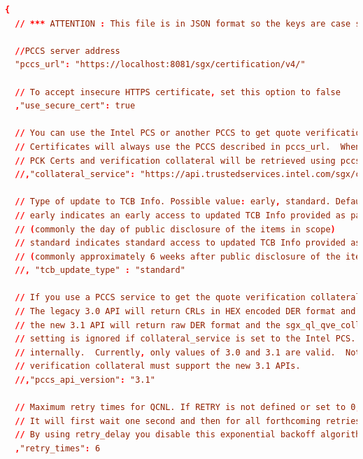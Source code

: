 \documentclass{article}
\begin{document}
\begin{lstlisting}[caption=Configurazione remote attestation per le Architectural Enclaves,label=default-qcnl.conf,language=toml]
{
  // *** ATTENTION : This file is in JSON format so the keys are case sensitive. Don't change them.

  //PCCS server address
  "pccs_url": "https://localhost:8081/sgx/certification/v4/"

  // To accept insecure HTTPS certificate, set this option to false
  ,"use_secure_cert": true

  // You can use the Intel PCS or another PCCS to get quote verification collateral.  Retrieval of PCK
  // Certificates will always use the PCCS described in pccs_url.  When collateral_service is not defined, both
  // PCK Certs and verification collateral will be retrieved using pccs_url
  //,"collateral_service": "https://api.trustedservices.intel.com/sgx/certification/v4/"

  // Type of update to TCB Info. Possible value: early, standard. Default is standard.
  // early indicates an early access to updated TCB Info provided as part of a TCB recovery event
  // (commonly the day of public disclosure of the items in scope)
  // standard indicates standard access to updated TCB Info provided as part of a TCB recovery event
  // (commonly approximately 6 weeks after public disclosure of the items in scope)
  //, "tcb_update_type" : "standard"

  // If you use a PCCS service to get the quote verification collateral, you can specify which PCCS API version is to be used.
  // The legacy 3.0 API will return CRLs in HEX encoded DER format and the sgx_ql_qve_collateral_t.version will be set to 3.0, while
  // the new 3.1 API will return raw DER format and the sgx_ql_qve_collateral_t.version will be set to 3.1. The pccs_api_version
  // setting is ignored if collateral_service is set to the Intel PCS. In this case, the pccs_api_version is forced to be 3.1
  // internally.  Currently, only values of 3.0 and 3.1 are valid.  Note, if you set this to 3.1, the PCCS use to retrieve
  // verification collateral must support the new 3.1 APIs.
  //,"pccs_api_version": "3.1"

  // Maximum retry times for QCNL. If RETRY is not defined or set to 0, no retry will be performed.
  // It will first wait one second and then for all forthcoming retries it will double the waiting time.
  // By using retry_delay you disable this exponential backoff algorithm
  ,"retry_times": 6


\end{lstlisting}
\end{document}
